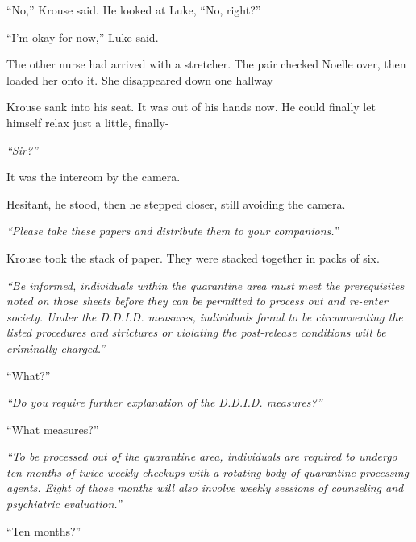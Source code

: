 ``No,'' Krouse said.  He looked at Luke, ``No, right?''



``I'm okay for now,'' Luke said.



The other nurse had arrived with a stretcher.  The pair checked Noelle over, then loaded her onto it.  She disappeared down one hallway



Krouse sank into his seat.  It was out of his hands now.  He could finally let himself relax just a little, finally-



\emph{``Sir?''}



It was the intercom by the camera.



Hesitant, he stood, then he stepped closer, still avoiding the camera.



\emph{``Please take these papers and distribute them to your companions.''}



Krouse took the stack of paper.  They were stacked together in packs of six.



\emph{``Be informed, individuals within the quarantine area must meet the prerequisites noted on those sheets before they can be permitted to process out and re-enter society. Under the D.D.I.D. measures, individuals found to be circumventing the listed procedures and strictures or violating the post-release conditions will be criminally charged.''}



``What?''



\emph{``Do you require further explanation of the D.D.I.D. measures?''}



``What measures?''



\emph{``To be processed out of the quarantine area, individuals are required to undergo ten months of twice-weekly checkups with a rotating body of quarantine processing agents.  Eight of those months will also involve weekly sessions of counseling and psychiatric evaluation.''}



``Ten months?''



